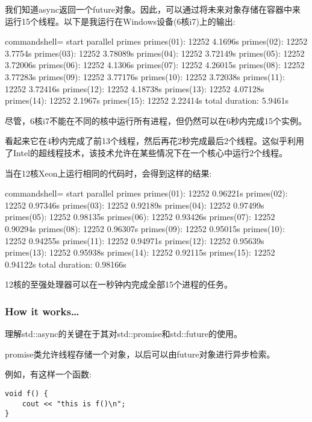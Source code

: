 \begin{itemize}
我们知道async返回一个future对象。因此，可以通过将未来对象存储在容器中来运行15个线程。以下是我运行在Windows设备(6核i7)上的输出:

\begin{tcblisting}{commandshell={}}
start parallel primes
primes(01): 12252 4.1696s
primes(02): 12252 3.7754s
primes(03): 12252 3.78089s
primes(04): 12252 3.72149s
primes(05): 12252 3.72006s
primes(06): 12252 4.1306s
primes(07): 12252 4.26015s
primes(08): 12252 3.77283s
primes(09): 12252 3.77176s
primes(10): 12252 3.72038s
primes(11): 12252 3.72416s
primes(12): 12252 4.18738s
primes(13): 12252 4.07128s
primes(14): 12252 2.1967s
primes(15): 12252 2.22414s
total duration: 5.9461s
\end{tcblisting}

尽管，6核i7不能在不同的核中运行所有进程，但仍然可以在6秒内完成15个实例。

看起来它在4秒内完成了前13个线程，然后再花2秒完成最后2个线程。这似乎利用了Intel的超线程技术，该技术允许在某些情况下在一个核心中运行2个线程。

当在12核Xeon上运行相同的代码时，会得到这样的结果:

\begin{tcblisting}{commandshell={}}
start parallel primes
primes(01): 12252 0.96221s
primes(02): 12252 0.97346s
primes(03): 12252 0.92189s
primes(04): 12252 0.97499s
primes(05): 12252 0.98135s
primes(06): 12252 0.93426s
primes(07): 12252 0.90294s
primes(08): 12252 0.96307s
primes(09): 12252 0.95015s
primes(10): 12252 0.94255s
primes(11): 12252 0.94971s
primes(12): 12252 0.95639s
primes(13): 12252 0.95938s
primes(14): 12252 0.92115s
primes(15): 12252 0.94122s
total duration: 0.98166s
\end{tcblisting}

12核的至强处理器可以在一秒钟内完成全部15个进程的任务。

\end{itemize}

\subsubsection{How it works…}

理解std::async的关键在于其对std::promise和std::future的使用。

promise类允许线程存储一个对象，以后可以由future对象进行异步检索。

例如，有这样一个函数:

\begin{lstlisting}[style=styleCXX]
void f() {
	cout << "this is f()\n";
}
\end{lstlisting}

